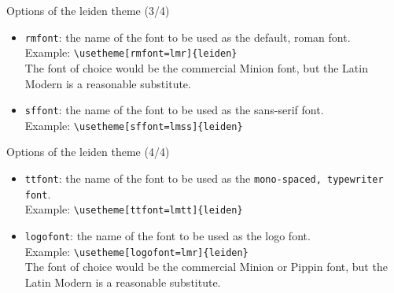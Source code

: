 \documentclass[t,11pt]{beamer}
\begin{document}
\begin{frame}[fragile]{Options of the leiden theme (3/4)}
\begin{itemize}
\item	\alert{\texttt{rmfont}}: the name of the font to be
		used as the default, \textrm{roman font}.\\
\vspace{0.1\baselineskip}
		Example: \verb|\usetheme[rmfont=lmr]{leiden}|\\
\vspace{0.1\baselineskip}
		The font of choice would be the commercial Minion
		font, but the Latin Modern is a reasonable substitute.
\vspace{0.5\baselineskip}
\item	\alert{\texttt{sffont}}: the name of the font to be
		used as the \textsf{sans-serif font}.\\
\vspace{0.1\baselineskip}
		Example: \verb|\usetheme[sffont=lmss]{leiden}|
\end{itemize}
\end{frame}

\begin{frame}[fragile]{Options of the leiden theme (4/4)}
\begin{itemize}
\item	\alert{\texttt{ttfont}}: the name of the font to be
		used as the \texttt{mono-spaced, typewriter font}.\\
\vspace{0.1\baselineskip}
		Example: \verb|\usetheme[ttfont=lmtt]{leiden}|
\vspace{0.5\baselineskip}
\item	\alert{\texttt{logofont}}: the name of the font to be
		used as the logo font.\\
\vspace{0.1\baselineskip}
		Example: \verb|\usetheme[logofont=lmr]{leiden}|\\
\vspace{0.1\baselineskip}
		The font of choice would be the commercial Minion or
		Pippin font, but the Latin Modern is a reasonable
		substitute.
\end{itemize}
\end{frame}
\end{document}
